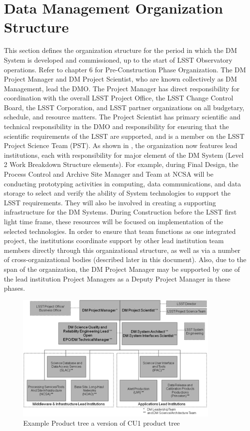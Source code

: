 \section{Data Management Organization Structure}
This section defines the organization structure for the period in which the DM System is developed and commissioned, up to the start of LSST Observatory operations.  Refer to chapter 6 for Pre-Construction Phase Organization.
The DM Project Manager and DM Project Scientist, who are known collectively as DM Management, lead the DMO.  The Project Manager has direct responsibility for coordination with the overall LSST Project Office, the LSST Change Control Board, the LSST Corporation, and LSST partner organizations on all budgetary, schedule, and resource matters.  The Project Scientist has primary scientific and technical responsibility in the DMO and responsibility for ensuring that the scientific requirements of the LSST are supported, and is a member on the LSST Project Science Team (PST). 
As shown in , the organization now features lead institutions, each with responsibility for major element of the DM System (Level 2 Work Breakdown Structure elements).  For example, during Final Design, the Process Control and Archive Site Manager and Team at NCSA will be conducting prototyping activities in computing, data communications, and data storage to select and verify the ability of System technologies to support the LSST requirements.  They will also be involved in creating a supporting infrastructure for the DM Systems.  During Construction before the LSST first light time frame, these resources will be focused on implementation of the selected technologies.  In order to ensure that team functions as one integrated project, the institutions coordinate support by other lead institution team members directly through this organizational structure, as well as via a number of cross-organizational bodies (described later in this document). 
Also, due to the span of the organization, the DM Project Manager may be supported by one of the lead institution Project Managers as a Deputy Project Manager in these phases.

\begin{figure}[htbp]
\begin{center}
 \includegraphics[width=0.9\textwidth]{images/dmorg}
\caption{Example Product tree a version of  CU1 product tree \label{fig:dmorg}}
\end{center}
\end{figure}

